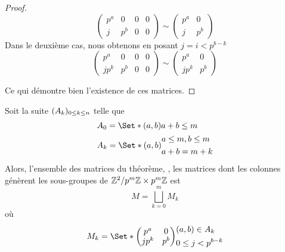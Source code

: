\documentclass[12pt]{article}
\newcommand*{\pmZpmZ }{p^m\Z \x p^m\Z}
\newcommand*{\ZZpmZ}{\Z^2/\pmZpmZ}
\begin{document}
\begin{proof}
\begin{equation*}
\begin{pmatrix}
			p^a & 0   & 0 & 0 \\
			j   & p^b & 0 & 0
		\end{pmatrix}
		\sim
		\begin{pmatrix}
			p^a & 0   \\
			j   & p^b
		\end{pmatrix}
	\end{equation*}
	Dans le deuxième cas, nous obtenons en posant $j = i < p^{b-k}$
	\begin{equation*}
		\begin{pmatrix}
			p^a  & 0   & 0 & 0 \\
			jp^k & p^b & 0 & 0
		\end{pmatrix}
		\sim
		\begin{pmatrix}
			p^a  & 0   \\
			jp^k & p^b
		\end{pmatrix}
	\end{equation*}

	Ce qui démontre bien l'existence de ces matrices.

\end{proof}

\begin{corollary}\label{union_m}
	Soit la suite $(A_{k})_{0 \le k \le n}$ telle que
	\begin{equation*}
		\begin{split}
			&A_0 = \Set*{(a,b)}{ a + b \le m}\\
			&A_k = \Set*{
				(a,b)}{
				\begin{aligned}
					 & a \le m, b \le m \\
					 & a + b = m + k
				\end{aligned}
			}
		\end{split}
	\end{equation*}
	Alors, l'ensemble des matrices du théorème, \cad, les matrices dont les colonnes
	génèrent les sous-groupes de $\ZZpmZ$ est
	$$M = \bigsqcup_{k = 0}^mM_k$$
	où
	\begin{equation*}
		M_k = \Set*{
			\begin{pmatrix}
				p^a  & 0   \\
				jp^k & p^b
			\end{pmatrix}
		}{
			\begin{aligned}
				 & (a, b) \in A_k      \\
				 & 0 \le j < p^{b - k}
			\end{aligned}
		}
	\end{equation*}
\end{corollary}
\end{document}
